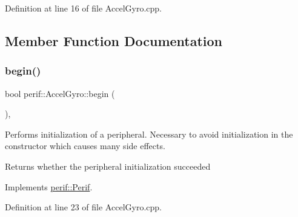 Definition at line 16 of file Accel\+Gyro.\+cpp.


\begin{DoxyCode}{0}

\end{DoxyCode}


\subsection{Member Function Documentation}
\mbox{\label{classperif_1_1AccelGyro_aebbf13d39d889c298103f16a02b4cce4}} 
\subsubsection{\texorpdfstring{begin()}{begin()}}
{\footnotesize\ttfamily bool perif\+::\+Accel\+Gyro\+::begin (\begin{DoxyParamCaption}{ }\end{DoxyParamCaption})\hspace{0.3cm}{\ttfamily [override]}, {\ttfamily [virtual]}}

Performs initialization of a peripheral. Necessary to avoid initialization in the constructor which causes many side effects.

\begin{DoxyReturn}{Returns}
whether the peripheral initialization succeeded 
\end{DoxyReturn}


Implements \mbox{\hyperlink{classperif_1_1Perif_ae7f1d1a4e9cd2343d51abc4ee21000cf}{perif\+::\+Perif}}.



Definition at line 23 of file Accel\+Gyro.\+cpp.


